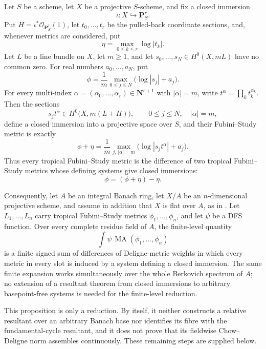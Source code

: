 \begin{proposition}
\label{prop:p171-closed-immersion-finite-level-reduction}
Let \(S\) be a scheme, let \(X\) be a projective \(S\)-scheme, and fix a
closed immersion
\[
 \iota:X\hookrightarrow\mathbf P^r_S.
\]
Put \(H=\iota^*\mathcal O_{\mathbf P^r_S}(1)\), let
\(t_0,\ldots,t_r\) be the pulled-back coordinate sections, and, whenever
metrics are considered, put
\[
                         \eta=\max_{0\leq k\leq r}\log|t_k|.
\]
Let \(L\) be a line bundle on \(X\), let \(m\geq1\), and let
\(s_0,\ldots,s_N\in H^0(X,mL)\) have no common zero.  For real numbers
\(a_0,\ldots,a_N\), put
\[
                 \phi=\frac1m\max_{0\leq j\leq N}
                              \bigl(\log|s_j|+a_j\bigr).
\]
For every multi-index
\(\alpha=(\alpha_0,\ldots,\alpha_r)\in\mathbf N^{r+1}\) with
\(|\alpha|=m\), write \(t^\alpha=\prod_k t_k^{\alpha_k}\).  Then the
sections
\[
           s_jt^\alpha\in H^0\bigl(X,m(L+H)\bigr),
           \qquad 0\leq j\leq N,\quad |\alpha|=m,
\]
define a closed immersion into a projective space over \(S\), and their
Fubini--Study metric is exactly
\begin{equation}
\label{eq:p171-closed-immersion-metric-identity}
 \phi+\eta
 =\frac1m\max_{j,\,|\alpha|=m}
       \bigl(\log|s_jt^\alpha|+a_j\bigr).
\end{equation}
Thus every tropical Fubini--Study metric is the difference of two
tropical Fubini--Study metrics whose defining systems give closed
immersions:
\begin{equation}
\label{eq:p171-closed-immersion-difference}
                         \phi=(\phi+\eta)-\eta.
\end{equation}

Consequently, let \(A\) be an integral Banach ring, let \(X/A\) be an
\(n\)-dimensional projective scheme, and assume in addition that \(X\) is
flat over \(A\), as in
\cite[Definition~4.8 and Question~4.9]{PS23Hybrid}.  Let
\(L_1,\ldots,L_n\) carry tropical
Fubini--Study metrics \(\phi_1,\ldots,\phi_n\), and let \(\psi\) be a DFS
function.  Over every complete residue field of \(A\), the finite-level
quantity
\[
                       \int\psi\,
                       \operatorname{MA}(\phi_1,\ldots,\phi_n)
\]
is a finite signed sum of differences of Deligne-metric weights in which
every metric in every slot is induced by a system defining a closed
immersion.  The same finite expansion works simultaneously over the whole
Berkovich spectrum of \(A\); no extension of a resultant theorem from
closed immersions to arbitrary basepoint-free systems is needed for the
finite-level reduction.
\end{proposition}

\begin{remark}
\label{rem:p171-closed-immersion-reduction-scope}
This proposition is only a reduction.  By itself, it neither constructs a
relative resultant over an arbitrary Banach base nor identifies its fibre
with the fundamental-cycle resultant, and it does not prove that its
fieldwise Chow--Deligne norm assembles continuously.  These remaining
steps are supplied below.
\end{remark}
